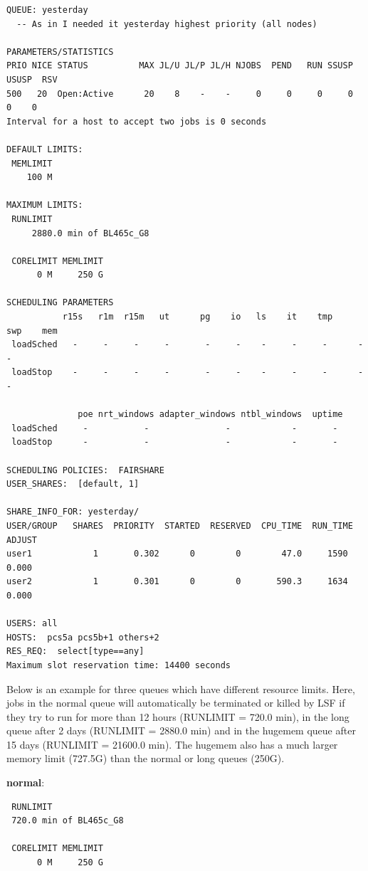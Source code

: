 \documentclass[11pt]{article}
\begin{document}
    \begin{verbatim}
QUEUE: yesterday
  -- As in I needed it yesterday highest priority (all nodes)

PARAMETERS/STATISTICS
PRIO NICE STATUS          MAX JL/U JL/P JL/H NJOBS  PEND   RUN SSUSP USUSP  RSV
500   20  Open:Active      20    8    -    -     0     0     0     0     0    0
Interval for a host to accept two jobs is 0 seconds

DEFAULT LIMITS:
 MEMLIMIT
    100 M

MAXIMUM LIMITS:
 RUNLIMIT
     2880.0 min of BL465c_G8

 CORELIMIT MEMLIMIT
      0 M     250 G

SCHEDULING PARAMETERS
           r15s   r1m  r15m   ut      pg    io   ls    it    tmp    swp    mem
 loadSched   -     -     -     -       -     -    -     -     -      -      -
 loadStop    -     -     -     -       -     -    -     -     -      -      -

              poe nrt_windows adapter_windows ntbl_windows  uptime
 loadSched     -           -               -            -       -
 loadStop      -           -               -            -       -

SCHEDULING POLICIES:  FAIRSHARE
USER_SHARES:  [default, 1]

SHARE_INFO_FOR: yesterday/
USER/GROUP   SHARES  PRIORITY  STARTED  RESERVED  CPU_TIME  RUN_TIME   ADJUST
user1            1       0.302      0        0        47.0     1590       0.000
user2            1       0.301      0        0       590.3     1634       0.000

USERS: all
HOSTS:  pcs5a pcs5b+1 others+2
RES_REQ:  select[type==any]
Maximum slot reservation time: 14400 seconds
\end{verbatim}

    Below is an example for three queues which have different resource
limits. Here, jobs in the normal queue will automatically be terminated
or killed by LSF if they try to run for more than 12 hours (RUNLIMIT =
720.0 min), in the long queue after 2 days (RUNLIMIT = 2880.0 min) and
in the hugemem queue after 15 days (RUNLIMIT = 21600.0 min). The hugemem
also has a much larger memory limit (727.5G) than the normal or long
queues (250G).

    \textbf{normal}:

\begin{verbatim}
 RUNLIMIT
 720.0 min of BL465c_G8

 CORELIMIT MEMLIMIT
      0 M     250 G
\end{verbatim}
\end{document}
